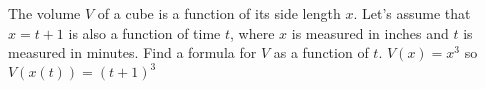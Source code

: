 { The volume $V$ of a cube is a function of its side length $x$.  Let's assume that $x = t + 1$ is also a function of time $t$, where $x$ is measured in inches and $t$ is measured in minutes.  Find a formula for $V$ as a function of $t$.}
{$V(x) = x^{3}$ so $V(x(t)) = (t + 1)^{3}$}